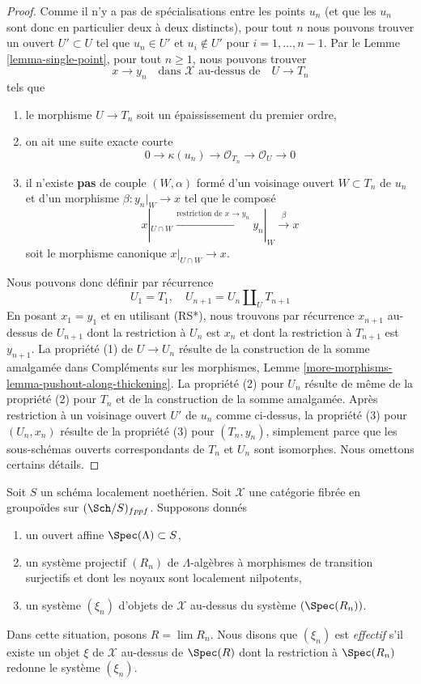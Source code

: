 \begin{proof}
Comme il n'y a pas de spécialisations entre les points $u_n$ (et que les
$u_n$ sont donc en particulier deux à deux distincts), pour tout $n$
nous pouvons trouver un ouvert $U' \subset U$
tel que $u_n \in U'$ et $u_i \not \in U'$ pour $i = 1, \ldots, n - 1$.
Par le Lemme \ref{lemma-single-point}, pour tout $n \geq 1$, nous pouvons trouver
$$
x \to y_n
\quad\text{dans }\mathcal{X}\text{ au-dessus de}\quad
U \to T_n
$$
tels que
\begin{enumerate}
\item le morphisme $U \to T_n$ soit un épaississement du premier ordre,
\item on ait une suite exacte courte
$$
0 \to \kappa(u_n) \to \mathcal{O}_{T_n} \to \mathcal{O}_U \to 0
$$
\item il n'existe {\bf pas} de couple $(W, \alpha)$
formé d'un voisinage ouvert $W \subset T_n$ de $u_n$
et d'un morphisme $\beta : y_n|_W \to x$ tel que le composé
$$
x|_{U \cap W} \xrightarrow{\text{restriction de }x \to y_n}
y_n|_W \xrightarrow{\beta} x
$$
soit le morphisme canonique $x|_{U \cap W} \to x$.
\end{enumerate}
Nous pouvons donc définir par récurrence
$$
U_1 = T_1, \quad
U_{n + 1} = U_n \amalg_U T_{n + 1}
$$
En posant $x_1 = y_1$ et en utilisant (RS*), nous trouvons par récurrence
$x_{n + 1}$ au-dessus de $U_{n + 1}$ dont la restriction à
$U_n$ est $x_n$ et dont la restriction à $T_{n + 1}$ est $y_{n + 1}$.
La propriété (1) de $U \to U_n$ résulte de la construction
de la somme amalgamée dans Compléments sur les morphismes, Lemme
\ref{more-morphisms-lemma-pushout-along-thickening}.
La propriété (2) pour $U_n$ résulte de même de
la propriété (2) pour $T_n$ et de la construction de la somme amalgamée.
Après restriction à un voisinage ouvert $U'$ de $u_n$
comme ci-dessus, la propriété (3) pour $(U_n, x_n)$ résulte de la propriété (3)
pour $(T_n, y_n)$, simplement parce que les sous-schémas ouverts correspondants
de $T_n$ et $U_n$ sont isomorphes. Nous omettons certains détails.
\end{proof}

\begin{remark}
\label{remark-strong-effectiveness}
Soit $S$ un schéma localement noethérien.
Soit $\mathcal{X}$ une catégorie fibrée en groupoïdes sur $(\Sch/S)_{fppf}$.
Supposons donnés
\begin{enumerate}
\item un ouvert affine $\Spec(\Lambda) \subset S$,
\item un système projectif $(R_n)$ de $\Lambda$-algèbres
à morphismes de transition surjectifs et dont les noyaux sont localement nilpotents,
\item un système $(\xi_n)$ d'objets de $\mathcal{X}$ au-dessus
du système $(\Spec(R_n))$.
\end{enumerate}
Dans cette situation, posons $R = \lim R_n$. Nous disons que
$(\xi_n)$ est {\it effectif} s'il existe un objet
$\xi$ de $\mathcal{X}$ au-dessus de $\Spec(R)$ dont la restriction
à $\Spec(R_n)$ redonne le système $(\xi_n)$.
\end{remark}

